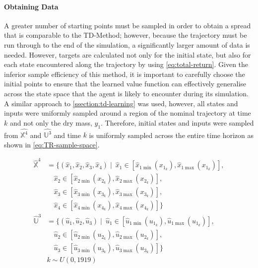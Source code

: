 \paragraph{Obtaining Data}
A greater number of starting points must be sampled in order to obtain a spread that is comparable to the TD-Method; however, because the trajectory must be run through to the end of the simulation, a significantly larger amount of data is needed. However, targets are calculated not only for the initial state, but also for each state encountered along the trajectory by using \autoref{eq:total-return}. Given the inferior sample efficiency of this method, it is important to carefully choose the initial points to ensure that the learned value function can effectively generalise across the state space that the agent is likely to encounter during its simulation.
A similar approach to \autoref{ssection:td-learning} was used, however, all states and inputs were uniformly sampled around a region of the nominal trajectory at time $k$ and not only the dry mass, $y_1$. Therefore, initial states and inputs were sampled from $\hat{\mathbb{X}^4}$ and $\hat{\mathbb{U}^3}$ and time $k$ is uniformly sampled across the entire time horizon as shown in \autoref{eq:TR-sample-space}.

\begin{equation}\label{eq:TR-sample-space}
\begin{split}
    \hat{\mathbb{X}}^4 &= \{ (\hat{x}_1, \hat{x}_2, \hat{x}_3, \hat{x}_4) \mid\ \hat{x}_1 \in [\hat{x}_{1\min}(x_{1_k}), \hat{x}_{1\max}(x_{1_k})], \\
    &\quad \hat{x}_2 \in [\hat{x}_{2\min}(x_{2_k}), \hat{x}_{2\max}(x_{2_k})], \\
    &\quad \hat{x}_3 \in [\hat{x}_{3\min}(x_{3_k}), \hat{x}_{3\max}(x_{3_k})], \\
    &\quad \hat{x}_4 \in [\hat{x}_{4\min}(x_{4_k}), \hat{x}_{4\max}(x_{4_k})] \} \\
    \hat{\mathbb{U}}^3 &= \{ (\hat{u}_1, \hat{u}_2, \hat{u}_3) \mid\ \hat{u}_1 \in [\hat{u}_{1\min}(u_{1_k}), \hat{u}_{1\max}(u_{1_k})], \\
    &\quad \hat{u}_2 \in [\hat{u}_{2\min}(u_{2_k}), \hat{u}_{2\max}(u_{2_k})], \\
    &\quad \hat{u}_3 \in [\hat{u}_{3\min}(u_{3_k}), \hat{u}_{3\max}(u_{3_k})] \} \\
    & k \sim U(0,1919)  \\
\end{split}
\end{equation}

